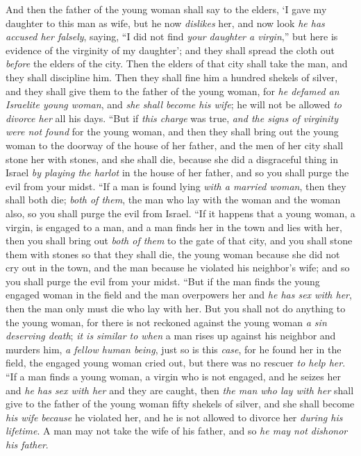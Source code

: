 \begin{biblechapter}
\verse And then the father of the young woman shall say to the elders, ‘I gave my daughter to this man as wife, but he now \textit{dislikes} her,
\verse and now look \textit{he has accused her falsely}, saying, “I did not find \textit{your daughter a virgin},” but here is evidence of the virginity of my daughter’; and they shall spread the cloth out \textit{before} the elders of the city.
\verse Then the elders of that city shall take the man, and they shall discipline him.
\verse Then they shall fine him a hundred shekels of silver, and they shall give them to the father of the young woman, for \textit{he defamed an Israelite young woman}, and \textit{she shall become his wife}; he will not be allowed \textit{to divorce her} all his days.
\verse “But if \textit{this charge} was true, \textit{and the signs of virginity were not found} for the young woman,
\verse and then they shall bring out the young woman to the doorway of the house of her father, and the men of her city shall stone her with stones, and she shall die, because she did a disgraceful thing in Israel \textit{by playing the harlot} in the house of her father, and so you shall purge the evil from your midst.
\verse “If a man is found lying \textit{with a married woman}, then they shall both die; \textit{both of them}, the man who lay with the woman and the woman also, so you shall purge the evil from Israel.
\verse “If it happens that a young woman, a virgin, is engaged to a man, and a man finds her in the town and lies with her,
\verse then you shall bring out \textit{both of them} to the gate of that city, and you shall stone them with stones so that they shall die, the young woman because she did not cry out in the town, and the man because he violated his neighbor’s wife; and so you shall purge the evil from your midst.
\verse “But if the man finds the young engaged woman in the field and the man overpowers her and \textit{he has sex with her}, then the man only must die who lay with her.
\verse But you shall not do anything to the young woman, for there is not reckoned against the young woman \textit{a sin deserving death}; \textit{it is similar to when} a man rises up against his neighbor and murders him, \textit{a fellow human being}, just so is this \textit{case},
\verse for he found her in the field, the engaged young woman cried out, but there was no rescuer \textit{to help her}.
\verse “If a man finds a young woman, a virgin who is not engaged, and he seizes her and \textit{he has sex with her} and they are caught,
\verse then \textit{the man who lay with her} shall give to the father of the young woman fifty shekels of silver, and she shall become \textit{his wife} \textit{because} he violated her, and he is not allowed to divorce her \textit{during his lifetime}.
\verse  A man may not take the wife of his father, and so \textit{he may not dishonor his father}.
\end{biblechapter}

